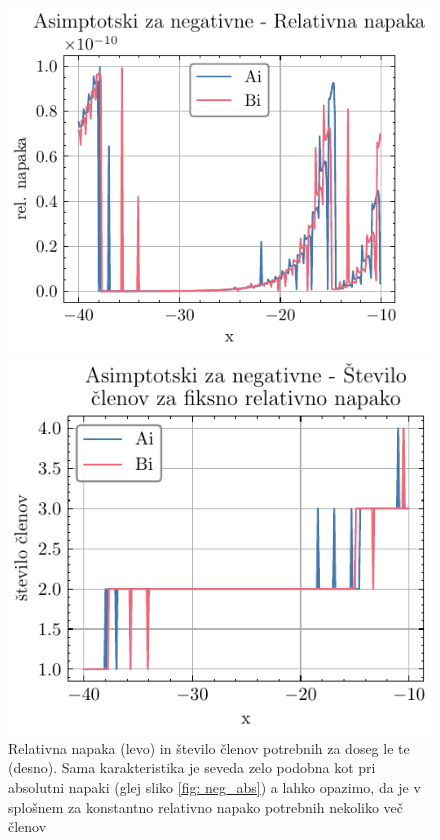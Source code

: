 \documentclass[slovene,11pt,a4paper]{article}
\begin{document}
\begin{figure}[H]%
  \centering
  \begin{minipage}{0.48\textwidth}
    \centering
    \includegraphics[width=\linewidth]{graphs/neg_rel_err.pdf}
  \end{minipage}\hfill
  \begin{minipage}{0.48\textwidth}
    \centering
    \includegraphics[width=\linewidth]{graphs/neg_rel_err_n.pdf}
  \end{minipage}
  \caption{Relativna napaka (levo) in število členov potrebnih za doseg le te (desno). Sama karakteristika je seveda zelo podobna kot pri absolutni napaki (glej sliko \ref{fig: neg_abs}) a lahko opazimo, da je v splošnem za konstantno relativno napako potrebnih nekoliko več členov}
  \label{fig: neg_rel}
\end{figure}
\end{document}
